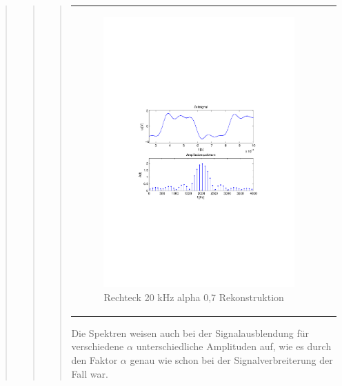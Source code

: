 \begin{quote}
\begin{quote}
\begin{quote}
\begin{center}
\begin{tabular}{ll}
                \begin{minipage}{0.6\textwidth}
                    \begin{figure}[H]
                        \includegraphics[scale=0.7, trim = 35mm 100mm 35mm 95mm, clip]{Bilder/shaperec20_07}
                       \caption{Rechteck 20 kHz alpha 0,7 Rekonstruktion}
		              \label{fig:shaperec20_07}
                    \end{figure}
                \end{minipage}
            
            \end{tabular}
            \end{center}
             
             Die Spektren weisen auch bei der Signalausblendung für verschiedene $\alpha$ unterschiedliche Amplituden
             auf, wie es durch den Faktor $\alpha$ genau wie schon bei der Signalverbreiterung der Fall war.
             

\end{quote}
\end{quote}
\end{quote}
